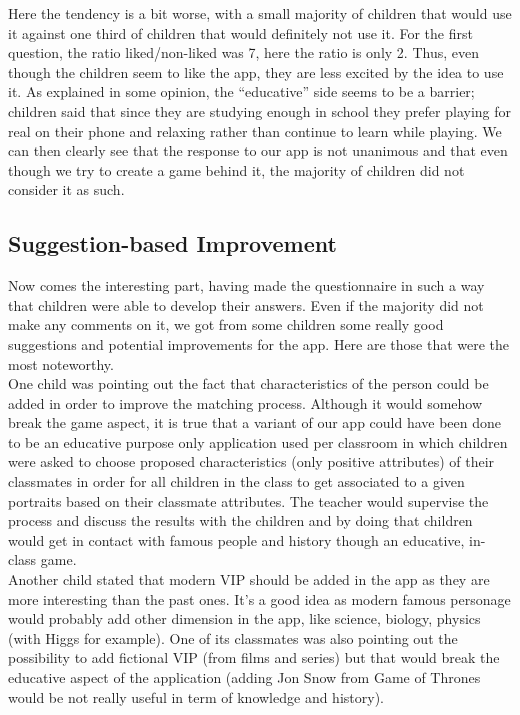 \documentclass[12pt]{scrartcl}
\begin{document}
			Here the tendency is a bit worse, with a small majority of children that would use it against one third of children that would definitely not use it. For the first question, the ratio liked/non-liked was 7, here the ratio is only 2. Thus, even though the children seem to like the app, they are less excited by the idea to use it. As explained in some opinion, the ``educative'' side seems to be a barrier; children said that since they are studying enough in school they prefer playing for real on their phone and relaxing rather than continue to learn while playing. We can then clearly see that the response to our app is not unanimous and that even though we try to create a game behind it, the majority of children did not consider it as such.

		
	\subsection{Suggestion-based Improvement}
	

		Now comes the interesting part, having made the questionnaire in such a way that children were able to develop their answers. Even if the majority did not make any comments on it, we got from some children some really good suggestions and potential improvements for the app. Here are those that were the most noteworthy.\\

		One child was pointing out the fact that characteristics of the person could be added in order to improve the matching process. Although it would somehow break the game aspect, it is true that a variant of our app could have been done to be an educative purpose only application used per classroom in which children were asked to choose proposed characteristics (only positive attributes) of their classmates in order for all children in the class to get associated to a given portraits based on their classmate attributes. The teacher would supervise the process and discuss the results with the children and by doing that children would get in contact with famous people and history though an educative, in-class game.\\
		
		Another child stated that modern VIP should be added in the app as they are more interesting than the past ones. It’s a good idea as modern famous personage would probably add other dimension in the app, like science, biology, physics (with Higgs for example). One of its classmates was also pointing out the possibility to add fictional VIP (from films and series) but that would break the educative aspect of the application (adding Jon Snow from Game of Thrones would be not really useful in term of knowledge and history).\\
		
\end{document}
